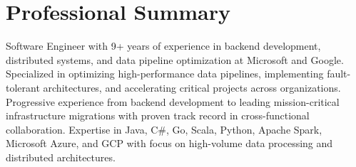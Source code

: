 \section{Professional Summary}
\small{Software Engineer with 9+ years of experience in backend development, distributed systems, and data pipeline optimization at Microsoft and Google. Specialized in optimizing high-performance data pipelines, implementing fault-tolerant architectures, and accelerating critical projects across organizations. Progressive experience from backend development to leading mission-critical infrastructure migrations with proven track record in cross-functional collaboration. Expertise in Java, C\#, Go, Scala, Python, Apache Spark, Microsoft Azure, and GCP with focus on high-volume data processing and distributed architectures.}